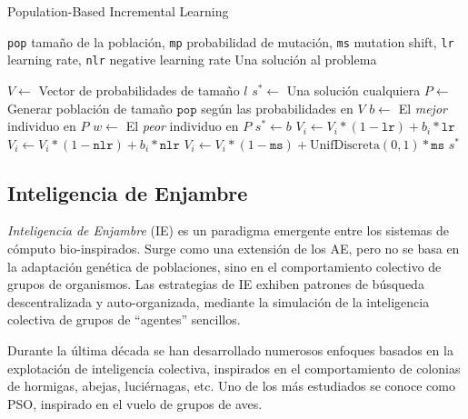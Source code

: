 \begin{algorithm}
\caption{Population-Based Incremental Learning}
\label{pbil-alg}
\begin{algorithmic}[1]

\Require \texttt{pop} tamaño de la población,
	\texttt{mp} probabilidad de mutación,
	\texttt{ms} mutation shift,
	\texttt{lr} learning rate,
	\texttt{nlr} negative learning rate
\Ensure Una solución al problema

\State $V \gets$ Vector de probabilidades de tamaño $l$
\State $s^* \gets$ Una solución cualquiera
	\State $P \gets$ Generar población de tamaño $\texttt{pop}$ según las probabilidades en $V$
	\State $b \gets $ El \emph{mejor} individuo en $P$
	\State $w \gets $ El \emph{peor} individuo en $P$
		\State $s^* \gets b$
	\EndIf
	 
		\State $V_i \gets V_i * (1 - \texttt{lr}) + b_i * \texttt{lr}$
			\State $V_i \gets V_i * (1 - \texttt{nlr}) + b_i * \texttt{nlr}$
		\EndIf
		 
			\State $V_i \gets V_i * (1 - \texttt{ms}) + \mathrm{UnifDiscreta}(0,1) * \texttt{ms}$
		\EndIf
	\EndFor
\EndWhile
\State \Return $s^*$

\end{algorithmic}
\end{algorithm}

\subsection{Inteligencia de Enjambre}

\emph{Inteligencia de Enjambre} \cite{Bonabeau:1999:SIN:328320} (IE) es un paradigma emergente entre los sistemas de cómputo bio-inspirados. Surge como una extensión de los AE, pero no se basa en la adaptación genética de poblaciones, sino en el comportamiento colectivo de grupos de organismos. Las estrategias de IE exhiben patrones de búsqueda descentralizada y auto-organizada, mediante la simulación de la inteligencia colectiva de grupos de ``agentes'' sencillos.

Durante la última década se han desarrollado numerosos enfoques basados en la explotación de inteligencia colectiva, inspirados en el comportamiento de colonias de hormigas, abejas, luciérnagas, etc. Uno de los más estudiados se conoce como PSO, inspirado en el vuelo de grupos de aves.


